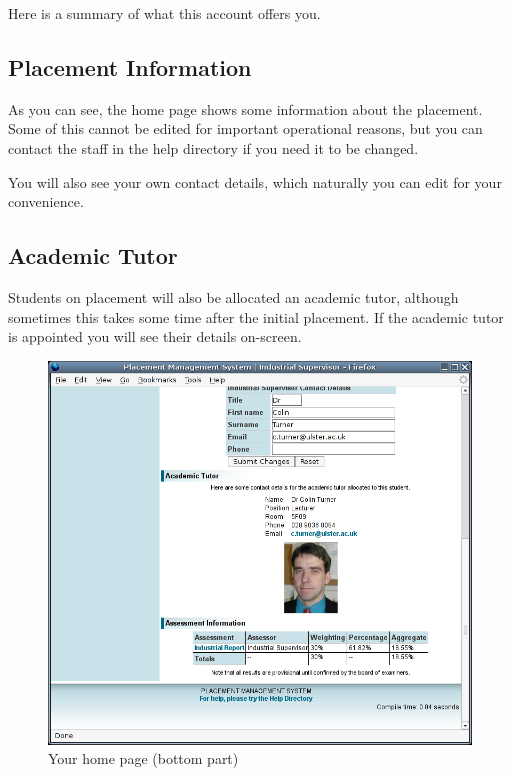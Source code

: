 \documentclass{article}
\begin{document}
Here is a summary of what this account offers you.

\subsection{Placement Information}

As you can see, the home page shows some information about the placement. Some of
this cannot be edited for important operational reasons, but you can contact the
staff in the help directory if you need it to be changed.

You will also see your own contact details, which naturally you can edit for your
convenience.

\subsection{Academic Tutor}

Students on placement will also be allocated an academic tutor, although sometimes
this takes some time after the initial placement. If the academic tutor is
appointed you will see their details on-screen.

\begin{figure}[htb]
\begin{center}
\includegraphics[scale=0.25]{png/supervisor_guide2.png}
\end{center}
\caption{Your home page (bottom part)}
\end{figure}
\end{document}

